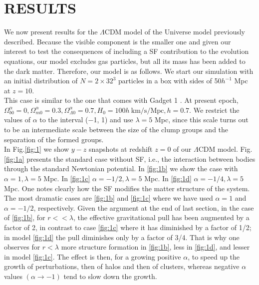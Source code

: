 \documentclass{article}
\begin{document}
\section{RESULTS}
We now present results for the $\Lambda$CDM model of the
Universe model previously described. Because the visible
component is the smaller one and given our interest
to test the consequences of including a SF contribution
to the evolution equations, our model excludes gas particles,
but all its mass has been added to the dark matter.
Therefore, our model is as follows. We start our
simulation with an initial distribution of $N= 2\times 32^{3}$
particles in a box with sides of 50$h^{-1}$ Mpc at $z = 10$. \\
This case is similar to the one that comes with Gadget 1
\cite{10_Springel2001}. At present epoch, $\Omega_{b 0}^{\alpha}=0, \Omega_{m 0}^{\alpha}=0.3, \Omega_{\Lambda 0}^{\alpha}=0.7,H_{0}=100 h \mathrm{~km} / \mathrm{s} / \mathrm{Mpc}, h=0.7$. We restrict the values
of $\alpha$ to the interval (−1, 1) \cite{13_Nagata2002,14_Nagata2004,15_Shirata2005,16_Umezu2005} and use $\lambda = 5$ Mpc, since this scale turns out to be an intermediate scale between the size of the clump groups and the separation of the formed groups.\\
In Fig.\ref{fig:1} we show $y - z$ snapshots at redshift $z = 0$ of our $\Lambda$CDM model. Fig. \ref{fig:1a} presents the standard case without SF, i.e., the interaction between bodies through
the standard Newtonian potential. In \ref{fig:1b} we show the
case with $\alpha = 1, \lambda = 5$ Mpc. In \ref{fig:1c} $\alpha = −1/2, \lambda = 5$ Mpc. In \ref{fig:1d} $\alpha = −1/4, \lambda = 5$ Mpc. One notes clearly
how the SF modifies the matter structure of the system.
The most dramatic cases are \ref{fig:1b} and \ref{fig:1c} where we have used $\alpha = 1$ and $\alpha = −1/2$, respectively. Given the argument at the end of last section, in the case of \ref{fig:1b},
for $r<<\lambda$, the effective gravitational pull has been augmented by a factor of 2, in contrast to case \ref{fig:1c} where it has diminished by a factor of 1/2; in model \ref{fig:1d} the pull diminishes only by a factor of 3/4. That is why one observes for $r<\lambda$ more structure formation in \ref{fig:1b}, less in \ref{fig:1d}, and lesser in model \ref{fig:1c}. The effect is then, for a growing positive $\alpha$, to speed up the growth of perturbations,
then of halos and then of clusters, whereas negative
$\alpha$ values $(\alpha \to -1)$ tend to slow down the growth.\\
\end{document}
